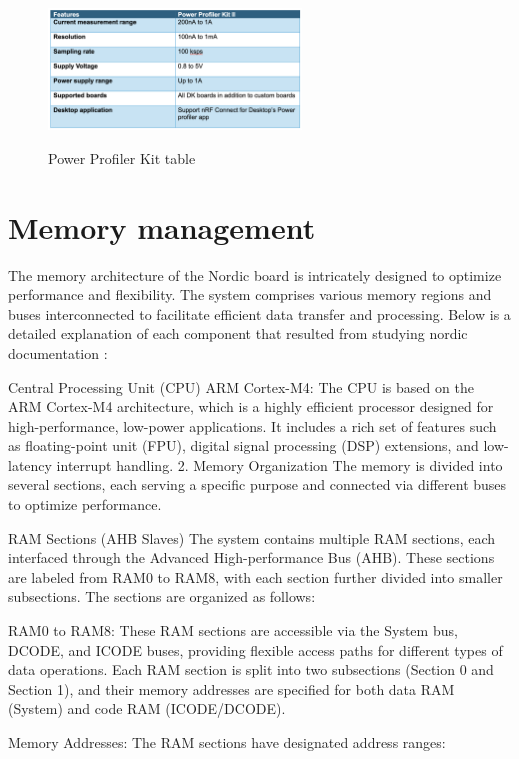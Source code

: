 \documentclass{Configuration_Files/PoliMi3i_thesis}
\begin{document}
\begin{figure}[H]
    \centering
    \includegraphics[width=0.6\textwidth]{Materials/figure5}
    \label{materials_5}
    \caption{Power Profiler Kit table}
\end{figure}


\section{Memory management}

The memory architecture of the Nordic board is intricately designed to optimize performance and flexibility. The system comprises various memory regions and buses interconnected to facilitate efficient data transfer and processing. Below is a detailed explanation of each component that resulted from studying nordic documentation \cite{NordicSemiconductorInfocenter}:

Central Processing Unit (CPU) ARM Cortex-M4: The CPU is based on the ARM Cortex-M4 architecture, which is a highly efficient processor designed for high-performance, low-power applications. It includes a rich set of features such as floating-point unit (FPU), digital signal processing (DSP) extensions, and low-latency interrupt handling.
2. Memory Organization
The memory is divided into several sections, each serving a specific purpose and connected via different buses to optimize performance.

RAM Sections (AHB Slaves)
The system contains multiple RAM sections, each interfaced through the Advanced High-performance Bus (AHB). These sections are labeled from RAM0 to RAM8, with each section further divided into smaller subsections. The sections are organized as follows:

RAM0 to RAM8: These RAM sections are accessible via the System bus, DCODE, and ICODE buses, providing flexible access paths for different types of data operations. Each RAM section is split into two subsections (Section 0 and Section 1), and their memory addresses are specified for both data RAM (System) and code RAM (ICODE/DCODE).

Memory Addresses: The RAM sections have designated address ranges:
\end{document}
